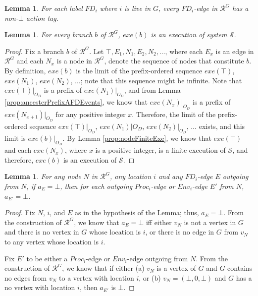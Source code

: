 \documentclass[11pt]{article}
\numberwithin{theorem}{section}
\newtheorem{lemma}[theorem]{Lemma}
\begin{document}
\begin{lemma}\label{prop:liveLocationNonBotAction}
For each label $FD_i$ where $i$ is live in $G$, every $FD_i$-edge in $\mathcal{R}^{G}$ has a non-$\bot$ action tag.
\end{lemma}



\begin{lemma}\label{lem:fairBranchUnfairExe}
For every branch $b$ of $\mathcal{R}^{G}$, $exe(b)$ is an execution of system $\mathcal{S}$.
\end{lemma}
\begin{proof}
Fix a branch $b$ of $\mathcal{R}^{G}$. Let $\top,E_1,N_1,E_2,N_2,\ldots$, where each $E_x$ is an edge in $\mathcal{R}^G$ and each $N_x$ is a node in $\mathcal{R}^G$,
denote the sequence of nodes that constitute $b$. By definition,
$exe(b)$ is the limit of the prefix-ordered sequence
$exe(\top)$, $exe(N_1)$, $exe(N_2)$, $\ldots$; note that this sequence might be infinite. Note that
$exe(\top)|_{O_D}$ is a prefix of
$exe(N_1)|_{O_D}$, and from Lemma
\ref{prop:ancesterPrefixAFDEvents}, we know that  $exe(N_x)|_{O_D}$ is
a prefix of $exe(N_{x+1})|_{O_D}$ for any positive integer
$x$. Therefore, the limit of the prefix-ordered sequence
$exe(\top)|_{O_D}$, $exe(N_1)|{O_D}$, $exe(N_2)|_{O_D}$, $\ldots$
exists, and this limit is $exe(b)|_{O_D}$. By Lemma
\ref{prop:nodeFiniteExe}, we know that $exe(\top)$ and each
$exe(N_x)$, where $x$ is a positive integer, is a finite execution of
$\mathcal{S}$, and therefore, $exe(b)$ is an execution of $\mathcal{S}$. 
\end{proof}
\begin{lemma}\label{lem:crashedLocationNoOutgoingActions}
For any node $N$ in $\mathcal{R}^G$, any location $i$ and any $FD_i$-edge $E$ outgoing from $N$, if $a_E = \bot$, then for each outgoing $Proc_i$-edge or $Env_i$-edge $E'$ from $N$, $a_{E'} = \bot$.
\end{lemma}
\begin{proof}
Fix $N$, $i$, and $E$ as in the hypothesis of the Lemma; thus, $a_E = \bot$. From the construction of $\mathcal{R}^G$, we know that $a_{E} = \bot$ iff either $v_N$ is not a vertex in $G$ and there  is no vertex in $G$ whose location is $i$, or there is no edge in $G$ from $v_{N}$ to any vertex whose location is $i$.

Fix $E'$ to be either a $Proc_i$-edge or $Env_i$-edge outgoing from $N$. From the construction of  $\mathcal{R}^G$, we know that if  either 
(a) $v_N$ is a vertex of $G$ and $G$ contains no edges from $v_N$ to a vertex with location $i$, or (b) $v_N = (\bot, 0, \bot)$ and $G$ has a no vertex with location $i$, then $a_{E'}$ is $\bot$. 
\end{proof}
\end{document}
